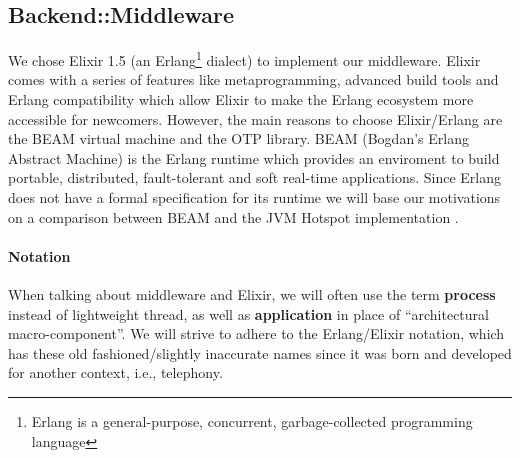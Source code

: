 \subsection{Backend::Middleware}
We chose Elixir 1.5 (an Erlang\footnote{Erlang is a general-purpose, concurrent, garbage-collected programming language} dialect) to implement
our middleware. Elixir comes with a series of features like metaprogramming,
advanced build tools and Erlang compatibility which allow Elixir to make the
Erlang ecosystem more accessible for newcomers.
However, the main reasons to choose Elixir/Erlang are the BEAM virtual machine
and the OTP library.
BEAM (Bogdan's Erlang Abstract Machine) is the Erlang runtime which provides an
enviroment to build portable, distributed, fault-tolerant and soft real-time
applications.
Since Erlang does not have a formal specification for its runtime we will
base our motivations on a comparison between BEAM and the JVM Hotspot
implementation \cite{poolcomparison}.

\paragraph{Notation}
When talking about middleware and Elixir, we will often use the term
\textbf{process} instead of lightweight thread, as well as \textbf{application}
in place of ``architectural macro-component''.
We will strive to adhere
to the Erlang/Elixir notation, which has these old fashioned/slightly inaccurate
names since it was born and developed for another context, i.e., telephony.

